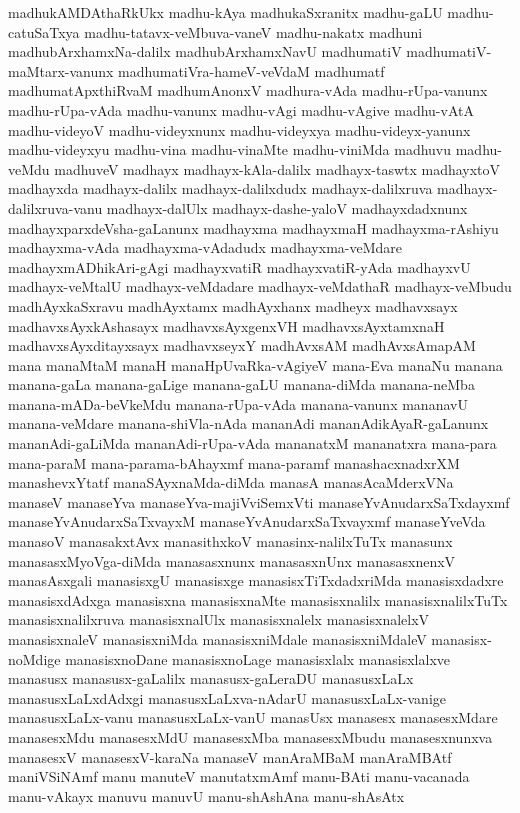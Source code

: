 {madhukAMDAthaRkUkx
madhu-kAya
madhukaSxranitx
madhu-gaLU
madhu-catuSaTxya
madhu-tatavx-veMbuva-vaneV
madhu-nakatx
madhuni
madhubArxhamxNa-dalilx
madhubArxhamxNavU
madhumatiV
madhumatiV-maMtarx-vanunx
madhumatiVra-hameV-veVdaM
madhumatf
madhumatApxthiRvaM
madhumAnonxV
madhura-vAda
madhu-rUpa-vanunx
madhu-rUpa-vAda
madhu-vanunx
madhu-vAgi
madhu-vAgive
madhu-vAtA
madhu-videyoV
madhu-videyxnunx
madhu-videyxya
madhu-videyx-yanunx
madhu-videyxyu
madhu-vina
madhu-vinaMte
madhu-viniMda
madhuvu
madhu-veMdu
madhuveV
madhayx
madhayx-kAla-dalilx
madhayx-taswtx
madhayxtoV
madhayxda
madhayx-dalilx
madhayx-dalilxdudx
madhayx-dalilxruva
madhayx-dalilxruva-vanu
madhayx-dalUlx
madhayx-dashe-yaloV
madhayxdadxnunx
madhayxparxdeVsha-gaLanunx
madhayxma
madhayxmaH
madhayxma-rAshiyu
madhayxma-vAda
madhayxma-vAdadudx
madhayxma-veMdare
madhayxmADhikAri-gAgi
madhayxvatiR
madhayxvatiR-yAda
madhayxvU
madhayx-veMtalU
madhayx-veMdadare
madhayx-veMdathaR
madhayx-veMbudu
madhAyxkaSxravu
madhAyxtamx
madhAyxhanx
madheyx
madhavxsayx
madhavxsAyxkAshasayx
madhavxsAyxgenxVH
madhavxsAyxtamxnaH
madhavxsAyxditayxsayx
madhavxseyxY
madhAvxsAM
madhAvxsAmapAM
mana
manaMtaM
manaH
manaHpUvaRka-vAgiyeV
mana-Eva
manaNu
manana
manana-gaLa
manana-gaLige
manana-gaLU
manana-diMda
manana-neMba
manana-mADa-beVkeMdu
manana-rUpa-vAda
manana-vanunx
mananavU
manana-veMdare
manana-shiVla-nAda
mananAdi
mananAdikAyaR-gaLanunx
mananAdi-gaLiMda
mananAdi-rUpa-vAda
mananatxM
mananatxra
mana-para
mana-paraM
mana-parama-bAhayxmf
mana-paramf
manashacxnadxrXM
manashevxYtatf
manaSAyxnaMda-diMda
manasA
manasAcaMderxVNa
manaseV
manaseYva
manaseYva-majiVviSemxVti
manaseYvAnudarxSaTxdayxmf
manaseYvAnudarxSaTxvayxM
manaseYvAnudarxSaTxvayxmf
manaseYveVda
manasoV
manasakxtAvx
manasithxkoV
manasinx-nalilxTuTx
manasunx
manasasxMyoVga-diMda
manasasxnunx
manasasxnUnx
manasasxnenxV
manasAsxgali
manasisxgU
manasisxge
manasisxTiTxdadxriMda
manasisxdadxre
manasisxdAdxga
manasisxna
manasisxnaMte
manasisxnalilx
manasisxnalilxTuTx
manasisxnalilxruva
manasisxnalUlx
manasisxnalelx
manasisxnalelxV
manasisxnaleV
manasisxniMda
manasisxniMdale
manasisxniMdaleV
manasisx-noMdige
manasisxnoDane
manasisxnoLage
manasisxlalx
manasisxlalxve
manasusx
manasusx-gaLalilx
manasusx-gaLeraDU
manasusxLaLx
manasusxLaLxdAdxgi
manasusxLaLxva-nAdarU
manasusxLaLx-vanige
manasusxLaLx-vanu
manasusxLaLx-vanU
manasUsx
manasesx
manasesxMdare
manasesxMdu
manasesxMdU
manasesxMba
manasesxMbudu
manasesxnunxva
manasesxV
manasesxV-karaNa
manaseV
manAraMBaM
manAraMBAtf
maniVSiNAmf
manu
manuteV
manutatxmAmf
manu-BAti
manu-vacanada
manu-vAkayx
manuvu
manuvU
manu-shAshAna
manu-shAsAtx
}
